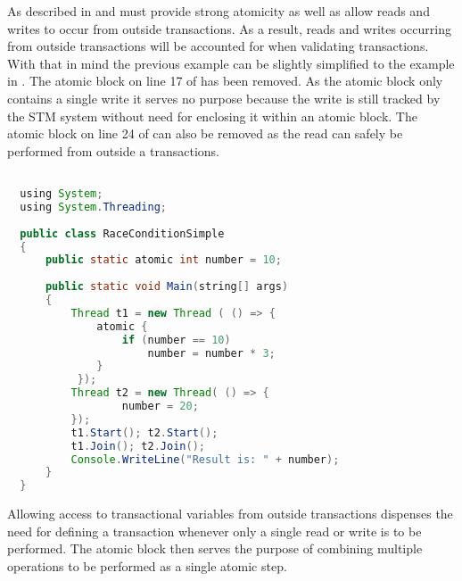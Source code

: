 As described in  and  \stmnamesp must provide strong atomicity as well as allow reads and writes to occur from outside transactions. As a result, reads and writes occurring from outside transactions will be accounted for when validating transactions. With that in mind the previous example can be slightly simplified to the example in . The atomic block on line 17 of  has been removed. As the atomic block only contains a single write it serves no purpose because the write is still tracked by the \ac{STM} system without need for enclosing it within an atomic block. The atomic block on line 24 of  can also be removed as the read can safely be performed from outside a transactions.

\begin{lstlisting}[label=lst:stm_atomic_syntax_simplified,
  caption={Transaction Syntax Simplified},
  language=Java,  
  showspaces=false,
  showtabs=false,
  breaklines=true,
  showstringspaces=false,
  breakatwhitespace=true,
  commentstyle=\color{greencomments},
  keywordstyle=\color{bluekeywords},
  stringstyle=\color{redstrings},
  morekeywords={atomic, retry, orElse, var, get, set, using}]  % Start your code-block

  using System;
  using System.Threading;
  
  public class RaceConditionSimple
  {
      public static atomic int number = 10;
  
      public static void Main(string[] args)
      {
          Thread t1 = new Thread ( () => {
              atomic {
                  if (number == 10)           
                      number = number * 3;
              }
           });
          Thread t2 = new Thread( () => {
                  number = 20;
          });
          t1.Start(); t2.Start();
          t1.Join(); t2.Join();
          Console.WriteLine("Result is: " + number);
      }
  }
\end{lstlisting}
Allowing access to transactional variables from outside transactions dispenses the need for defining a transaction whenever only a single read or write is to be performed. The atomic block then serves the purpose of combining multiple operations to be performed as a single atomic step.

